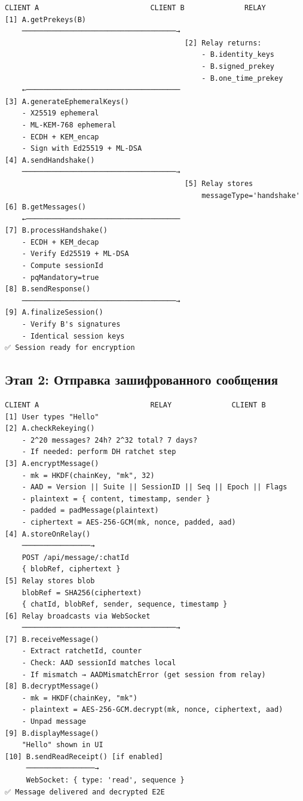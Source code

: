 \documentclass[11pt,a4paper,oneside]{book}
\begin{document}
\begin{verbatim}
CLIENT A                          CLIENT B              RELAY
[1] A.getPrekeys(B)
    ────────────────────────────────────→
                                          [2] Relay returns:
                                              - B.identity_keys
                                              - B.signed_prekey
                                              - B.one_time_prekey
    ←────────────────────────────────────
[3] A.generateEphemeralKeys()
    - X25519 ephemeral
    - ML-KEM-768 ephemeral
    - ECDH + KEM_encap
    - Sign with Ed25519 + ML-DSA
[4] A.sendHandshake()
    ────────────────────────────────────→
                                          [5] Relay stores
                                              messageType='handshake'
[6] B.getMessages()
    ←────────────────────────────────────
[7] B.processHandshake()
    - ECDH + KEM_decap
    - Verify Ed25519 + ML-DSA
    - Compute sessionId
    - pqMandatory=true
[8] B.sendResponse()
    ────────────────────────────────────→
[9] A.finalizeSession()
    - Verify B's signatures
    - Identical session keys
✅ Session ready for encryption
\end{verbatim}
\vspace{-0.2cm}\subsection{Этап 2: Отправка зашифрованного сообщения}
\begin{verbatim}
CLIENT A                          RELAY              CLIENT B
[1] User types "Hello"
[2] A.checkRekeying()
    - 2^20 messages? 24h? 2^32 total? 7 days?
    - If needed: perform DH ratchet step
[3] A.encryptMessage()
    - mk = HKDF(chainKey, "mk", 32)
    - AAD = Version || Suite || SessionID || Seq || Epoch || Flags
    - plaintext = { content, timestamp, sender }
    - padded = padMessage(plaintext)
    - ciphertext = AES-256-GCM(mk, nonce, padded, aad)
[4] A.storeOnRelay()
    ────────────────→
    POST /api/message/:chatId
    { blobRef, ciphertext }
[5] Relay stores blob
    blobRef = SHA256(ciphertext)
    { chatId, blobRef, sender, sequence, timestamp }
[6] Relay broadcasts via WebSocket
    ────────────────────────────────────→
[7] B.receiveMessage()
    - Extract ratchetId, counter
    - Check: AAD sessionId matches local
    - If mismatch → AADMismatchError (get session from relay)
[8] B.decryptMessage()
    - mk = HKDF(chainKey, "mk")
    - plaintext = AES-256-GCM.decrypt(mk, nonce, ciphertext, aad)
    - Unpad message
[9] B.displayMessage()
    "Hello" shown in UI
[10] B.sendReadReceipt() [if enabled]
     ────────────────→
     WebSocket: { type: 'read', sequence }
✅ Message delivered and decrypted E2E
\end{verbatim}
\end{document}

